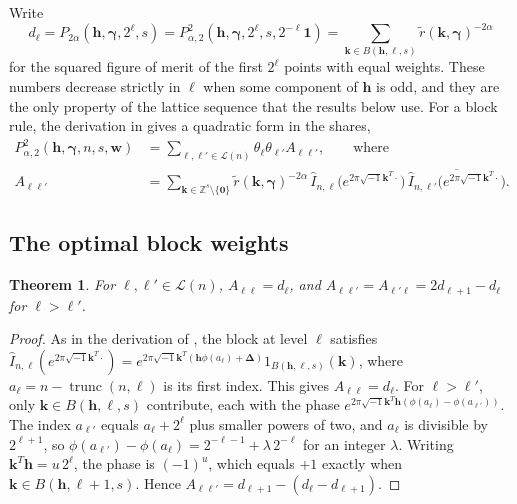 \documentclass[preprint,12pt,authoryear]{elsarticle}
\newtheorem{theorem}{Theorem}
\begin{document}
Write
\[
 d_\ell=P_{2\alpha}(\boldsymbol h,\boldsymbol\gamma,2^\ell,s)
 =P_{\alpha,2}^2(\boldsymbol h,\boldsymbol\gamma,2^\ell,s,2^{-\ell}\boldsymbol 1)
 =\sum_{\boldsymbol k\in B(\boldsymbol h,\ell,s)}\widetilde r(\boldsymbol k,\boldsymbol\gamma)^{-2\alpha}
\]
for the squared figure of merit of the first $2^\ell$ points with equal
weights. These numbers decrease strictly in $\ell$ when some component of
$\boldsymbol h$ is odd, and they are the only property of the lattice
sequence that the results below use. For a block rule, the derivation in
\citet[Section~5.1]{MDH26} gives a quadratic form in the shares,
\begin{align*}
 P_{\alpha,2}^2(\boldsymbol h,\boldsymbol\gamma,n,s,\boldsymbol w)
 &=\sum_{\ell,\ell'\in\mathcal L(n)}\theta_\ell\theta_{\ell'}A_{\ell\ell'},\qquad\text{where}\\
 A_{\ell\ell'}&=\sum_{\boldsymbol k\in\mathbb Z^s\setminus\{\boldsymbol 0\}}
 \widetilde r(\boldsymbol k,\boldsymbol\gamma)^{-2\alpha}\,
 \widehat I_{n,\ell}\bigl(e^{2\pi\sqrt{-1}\boldsymbol k^T\cdot}\bigr)\,
 \overline{\widehat I_{n,\ell'}\bigl(e^{2\pi\sqrt{-1}\boldsymbol k^T\cdot}\bigr)} .
\end{align*}

\subsection{The optimal block weights}\label{sec:bw-opt}

\begin{theorem}\label{thm:bw-structure}
For $\ell,\ell'\in\mathcal L(n)$, $A_{\ell\ell}=d_\ell$, and
$A_{\ell\ell'}=A_{\ell'\ell}=2d_{\ell+1}-d_\ell$ for $\ell>\ell'$.
\end{theorem}

\begin{proof}
As in the derivation of \citet[Eq.~(5)]{MDH26}, the block at level $\ell$ satisfies
$\widehat I_{n,\ell}(e^{2\pi\sqrt{-1}\boldsymbol k^T\cdot})
=e^{2\pi\sqrt{-1}\boldsymbol k^T(\boldsymbol h\phi(a_\ell)+\boldsymbol\Delta)}
1_{B(\boldsymbol h,\ell,s)}(\boldsymbol k)$, where
$a_\ell=n-\operatorname{trunc}(n,\ell)$ is its first index. This gives
$A_{\ell\ell}=d_\ell$. For $\ell>\ell'$, only
$\boldsymbol k\in B(\boldsymbol h,\ell,s)$ contribute, each with the phase
$e^{2\pi\sqrt{-1}\boldsymbol k^T\boldsymbol h(\phi(a_\ell)-\phi(a_{\ell'}))}$.
The index $a_{\ell'}$ equals $a_\ell+2^\ell$ plus smaller powers of two, and
$a_\ell$ is divisible by $2^{\ell+1}$, so
$\phi(a_{\ell'})-\phi(a_\ell)=2^{-\ell-1}+\lambda\,2^{-\ell}$ for an integer
$\lambda$. Writing $\boldsymbol k^T\boldsymbol h=u\,2^\ell$, the phase is
$(-1)^u$, which equals $+1$ exactly when
$\boldsymbol k\in B(\boldsymbol h,\ell+1,s)$. Hence
$A_{\ell\ell'}=d_{\ell+1}-(d_\ell-d_{\ell+1})$.
\end{proof}
\end{document}
